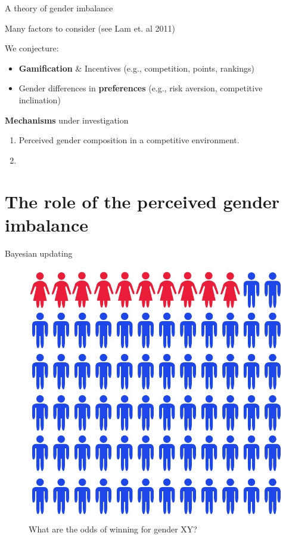 \begin{frame}{A theory of gender imbalance}

Many factors to consider (see Lam et. al 2011)

We conjecture:

\begin{itemize}
\tightlist
\item
  \textbf{Gamification} \& Incentives (e.g., competition, points,
  rankings)
\item
  Gender differences in \textbf{preferences} (e.g., risk aversion,
  competitive inclination)
\end{itemize}

\pause

\textbf{Mechanisms} under investigation

\begin{enumerate}
\def\labelenumi{\arabic{enumi}.}
\tightlist
\item
  Perceived gender composition in a competitive environment.
\item
  \color{gray}{Collaboration incentives under gender imbalance [next study]}
\end{enumerate}

\end{frame}

\section{The role of the perceived gender
imbalance}\label{the-role-of-the-perceived-gender-imbalance}

\begin{frame}{Bayesian updating}

\begin{figure}
\centering
\includegraphics{female_fuel_for_the_digital_economy.jpg}
\caption{What are the odds of winning for gender XY?}
\end{figure}

\end{frame}

